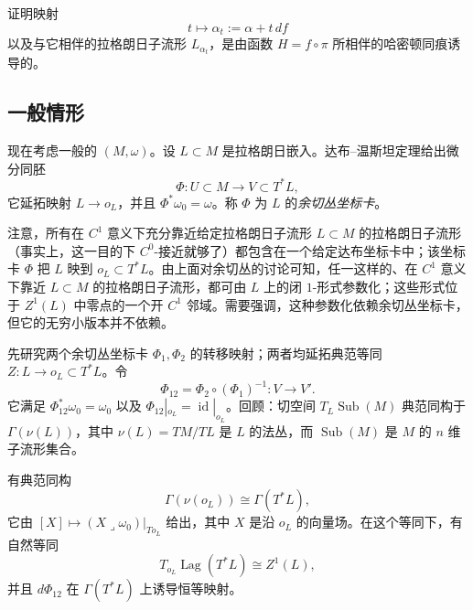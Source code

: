 \begin{exercise}\label{ex:closed-form-graph-hamiltonian}
证明映射
\[
 t\longmapsto\alpha_t:=\alpha+t\,df
\]
以及与它相伴的拉格朗日子流形 $L_{\alpha_t}$，是由函数
$H=f\circ\pi$ 所相伴的哈密顿同痕诱导的。
\end{exercise}

\subsection{一般情形}
\label{subsec:general-lagrangian-deformation}

现在考虑一般的 $(M,\omega)$。设 $L\subset M$ 是拉格朗日嵌入。达布--温斯坦定理给出微分同胚
\[
 \Phi:U\subset M\longrightarrow V\subset T^*L,
\]
它延拓映射 $L\to o_L$，并且 $\Phi^*\omega_0=\omega$。称 $\Phi$ 为 $L$ 的\emph{余切丛坐标卡}。

注意，所有在 $C^1$ 意义下充分靠近给定拉格朗日子流形 $L\subset M$ 的拉格朗日子流形（事实上，这一目的下 $C^0$-接近就够了）都包含在一个给定达布坐标卡中；该坐标卡 $\Phi$ 把 $L$ 映到
$o_L\subset T^*L$。由上面对余切丛的讨论可知，任一这样的、在 $C^1$ 意义下靠近 $L\subset M$ 的拉格朗日子流形，都可由 $L$ 上的闭 $1$-形式参数化；这些形式位于 $Z^1(L)$ 中零点的一个开 $C^1$ 邻域。需要强调，这种参数化依赖余切丛坐标卡，但它的无穷小版本并不依赖。

先研究两个余切丛坐标卡 $\Phi_1,\Phi_2$ 的转移映射；两者均延拓典范等同
$Z:L\to o_L\subset T^*L$。令
\[
 \Phi_{12}=\Phi_2\circ(\Phi_1)^{-1}:V\longrightarrow V'.
\]
它满足 $\Phi_{12}^*\omega_0=\omega_0$ 以及
$\Phi_{12}|_{o_L}=\operatorname{id}|_{o_L}$。回顾：切空间
$T_L\operatorname{Sub}(M)$ 典范同构于 $\Gamma(\nu(L))$，其中
$\nu(L)=TM/TL$ 是 $L$ 的法丛，而 $\operatorname{Sub}(M)$ 是 $M$ 的 $n$ 维子流形集合。

\begin{lemma}\label{lem:normal-cotangent-identification}
有典范同构
\[
 \Gamma(\nu(o_L))\cong\Gamma(T^*L),
\]
它由
$[X]\mapsto(X\mathbin{\lrcorner}\omega_0)|_{To_L}$ 给出，其中 $X$ 是沿
$o_L$ 的向量场。在这个等同下，有自然等同
\begin{equation}
 T_{o_L}\operatorname{Lag}(T^*L)\cong Z^1(L),
 \label{eq:tangent-lag-closed-forms}
\end{equation}
并且 $d\Phi_{12}$ 在 $\Gamma(T^*L)$ 上诱导恒等映射。
\end{lemma}

